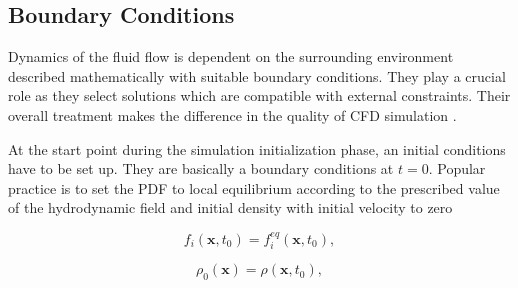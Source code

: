 %
%
%
%
%
%
%


\subsection{Boundary Conditions}
Dynamics of the fluid flow is dependent on the surrounding environment described mathematically with suitable boundary conditions. They play a crucial role as they select solutions which are compatible with external constraints. Their overall treatment makes the difference in the quality of CFD simulation \citep{succi2018}.

At the start point during the simulation initialization phase, an initial conditions have to be set up. They are basically a boundary conditions at $t = 0$. Popular practice is to set the PDF to local equilibrium according to the prescribed value of the hydrodynamic field and initial density with initial velocity to zero

\begin{equation}
	\label{eq:initial-conditions-pdf}
	f_i (\bm{x},t_0) = f_i^{eq} (\bm{x},t_0),
\end{equation}

\begin{equation}
	\label{eq:initial-conditions-density}
	\rho_0 (\bm{x}) = \rho (\bm{x},t_0), 
\end{equation}

